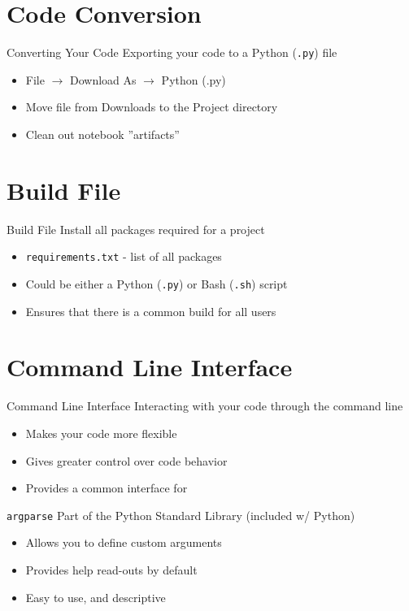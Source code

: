 \documentclass[12pt,t]{beamer}
\begin{document}
\section{Code Conversion}

\begin{frame}{Converting Your Code}
	Exporting your code to a Python (\texttt{.py}) file
	\begin{itemize}
		\item File $\to$ Download As $\to$ Python (.py)
		\item Move file from Downloads to the Project directory
		\item Clean out notebook ''artifacts''
	\end{itemize}
\end{frame}

\section{Build File}

\begin{frame}{Build File}
	Install all packages required for a project
	\begin{itemize}
		\item \texttt{requirements.txt} - list of all packages
		\item Could be either a Python (\texttt{.py}) or Bash (\texttt{.sh}) script
		\item Ensures that there is a common build for all users
	\end{itemize}
\end{frame}

\section{Command Line Interface}

\begin{frame}{Command Line Interface}
	Interacting with your code through the command line
	\begin{itemize}
		\item Makes your code more flexible
		\item Gives greater control over code behavior
		\item Provides a common interface for 
	\end{itemize}
\end{frame}

\begin{frame}{\texttt{argparse}}
	Part of the Python Standard Library (included w/ Python)
	\begin{itemize}
		\item Allows you to define custom arguments
		\item Provides help read-outs by default
		\item Easy to use, and descriptive
	\end{itemize}
\end{frame}
\end{document}
